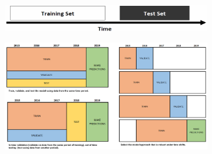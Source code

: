 \begin{figure}[H]
  \centering
  \begin{subfigure}{0.5\textwidth}
    \centering
    \includegraphics[width=\textwidth]{assets/sl/cross_val__out_of_time_concept.png}
  \end{subfigure}

  \vspace*{0.5cm}
  \begin{subfigure}{\textwidth}
    \centering
    \includegraphics[width=\textwidth]{assets/sl/cross_val__out_of_time_model_models.png}
  \end{subfigure}


\end{figure}
